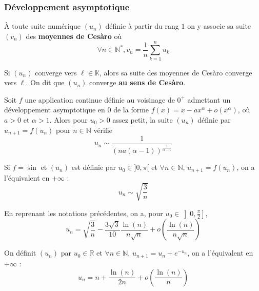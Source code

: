   \subsubsection{Développement asymptotique}


  \begin{definition}
    À toute suite numérique $(u_n)$ définie à partir du rang $1$ on y associe sa suite $(v_n)$ des \textbf{moyennes de Cesàro} où
    \[ \forall n \in \mathbb{N}^*, v_n = \frac{1}{n} \sum_{k=1}^{n} u_k \]
  \end{definition}

  \begin{theorem}
    Si $(u_n)$ converge vers $\ell \in \mathbb{K}$, alors sa suite des moyennes de Cesàro converge vers $\ell$. On dit que $(u_n)$ converge \textbf{au sens de Cesàro}.
  \end{theorem}


  \begin{proposition}
    Soit $f$ une application continue définie au voisinage de $0^+$ admettant
    un développement asymptotique en $0$ de la forme $f(x) = x - ax^\alpha + o(x^\alpha)$, où $a > 0$ et $\alpha > 1$. Alors pour $u_0 > 0$ assez petit, la suite $(u_n)$ définie par $u_{n+1} = f(u_n)$ pour $n \in \mathbb{N}$ vérifie
    \[ u_n \sim \frac{1}{(na(\alpha-1))^{\frac{1}{\alpha-1}}} \]
  \end{proposition}

  \begin{example}
    Si $f = \sin$ et $(u_n)$ est définie par $u_0 \in ]0, \pi[$ et $\forall n \in \mathbb{N}, \, u_{n+1} = f(u_n)$, on a l'équivalent en $+\infty$ :
    \[ u_n \sim \sqrt{\frac{3}{n}} \]
  \end{example}


  \begin{proposition}
    En reprenant les notations précédentes, on a, pour $u_0 \in \left] 0, \frac{\pi}{2} \right]$,
    \[ u_n = \sqrt{\frac{3}{n}} - \frac{3 \sqrt{3}}{10} \frac{\ln(n)}{n\sqrt{n}} + o\left( \frac{\ln(n)}{n\sqrt{n}} \right) \]
  \end{proposition}


  \begin{example}
    On définit $(u_n)$ par $u_0 \in \mathbb{R}$ et $\forall n \in \mathbb{N}, \, u_{n+1} = u_n + e^{-u_n}$, on a l'équivalent en $+\infty$ :
    \[ u_n = n + \frac{\ln(n)}{2n} + o\left( \frac{\ln(n)}{n} \right) \]
  \end{example}


